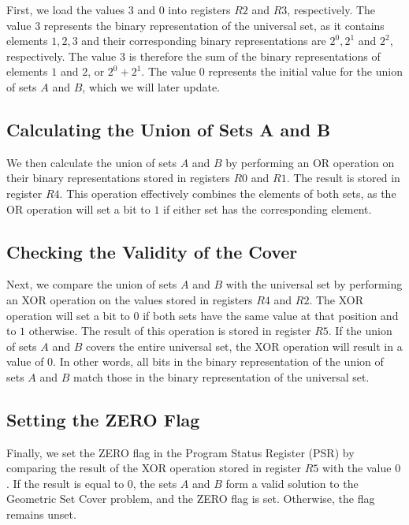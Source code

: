 First, we load the values $3$ and $0$ into registers $R2$ and $R3$, respectively. The value $3$ represents the binary representation of the universal set, as it contains elements $1, 2, 3$ and their corresponding binary representations are $2^0, 2^1$ and $2^2$, respectively. The value $3$ is therefore the sum of the binary representations of elements $1$ and $2$, or $2^0 + 2^1$. The value $0$ represents the initial value for the union of sets $A$ and $B$, which we will later update.

\subsection{Calculating the Union of Sets A and B}

We then calculate the union of sets $A$ and $B$ by performing an OR operation on their binary representations stored in registers $R0$ and $R1$. The result is stored in register $R4$. This operation effectively combines the elements of both sets, as the OR operation will set a bit to $1$ if either set has the corresponding element.

\subsection{Checking the Validity of the Cover}

Next, we compare the union of sets $A$ and $B$ with the universal set by performing an XOR operation on the values stored in registers $R4$ and $R2$. The XOR operation will set a bit to $0$ if both sets have the same value at that position and to $1$ otherwise. The result of this operation is stored in register $R5$. If the union of sets $A$ and $B$ covers the entire universal set, the XOR operation will result in a value of $0$. In other words, all bits in the binary representation of the union of sets $A$ and $B$ match those in the binary representation of the universal set.

\subsection{Setting the ZERO Flag}

Finally, we set the ZERO flag in the Program Status Register (PSR) by comparing the result of the XOR operation stored in register $R5$ with the value $0$. If the result is equal to $0$, the sets $A$ and $B$ form a valid solution to the Geometric Set Cover problem, and the ZERO flag is set. Otherwise, the flag remains unset.

